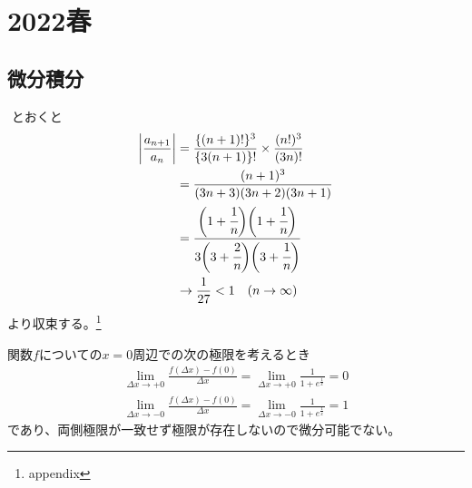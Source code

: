 \section{2022春}

\setcounter{yearcounter}{2022}


\subsection{微分積分}
\begin{ans*}
  ${}$
  とおくと
  \begin{align}
    \left| \frac{a_{n+1}}{a_{n}} \right|
    &= \frac{\{(n+1)!\}^3}{\{3(n+1)\}!} \times \frac{(n!)^3}{(3n)!} \\
    &= \frac{(n+1)^3}{(3n+3)(3n+2)(3n+1)} \\
    &= \frac{\biggl(1+\cfrac{1}{n}\biggr)\biggl(1+\cfrac{1}{n}\biggr)}
    {3\biggl(3+\cfrac{2}{n}\biggr)\biggl(3+\cfrac{1}{n}\biggr)} \\
    &\to \frac{1}{27} < 1 \quad(n\to\infty)
  \end{align}
  より収束する。\footnote{appendix}
\end{ans*}



\begin{ans*}
  関数$f$についての$x=0$周辺での次の極限を考えるとき
  \begin{align}
    \lim_{\Delta x\to +0}\frac{f(\Delta x) - f(0)}{\Delta x}
    = \lim_{\Delta x\to +0}\frac{1}{1+e^{\frac{1}{x}}}
    = 0 \\
    \lim_{\Delta x\to -0}\frac{f(\Delta x) - f(0)}{\Delta x}
    = \lim_{\Delta x\to -0}\frac{1}{1+e^{\frac{1}{x}}}
    = 1
  \end{align}
  であり、両側極限が一致せず極限が存在しないので微分可能でない。
\end{ans*}


